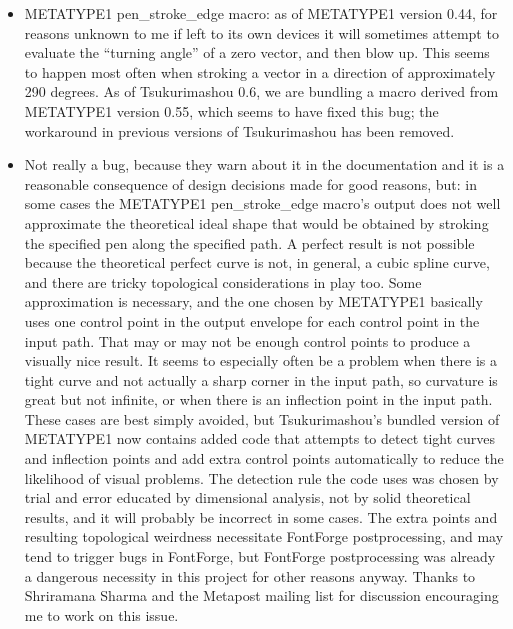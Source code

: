 \documentclass[14pt]{extarticle}
\begin{document}
\begin{itemize}
  \item METATYPE1 pen\_stroke\_edge macro: as of METATYPE1 version
    0.44, for reasons unknown to me if left to its own devices it will
    sometimes attempt to evaluate the ``turning angle'' of a zero vector,
    and then blow up.  This seems to happen most often when stroking a
    vector in a direction of approximately 290 degrees.  As of Tsukurimashou
    0.6, we are bundling a macro derived from METATYPE1 version 0.55, which
    seems to have fixed this bug; the workaround in previous versions of
    Tsukurimashou has been removed.

  \item Not really a bug, because they warn about it in the documentation
    and it is a reasonable consequence of design decisions made for good
    reasons, but: in some cases the METATYPE1 pen\_stroke\_edge macro's
    output does not well approximate the theoretical ideal shape that would
    be obtained by stroking the specified pen along the specified path.  A
    perfect result is not possible because the theoretical perfect curve is
    not, in general, a cubic spline curve, and there are tricky topological
    considerations in play too.  Some approximation is necessary, and the
    one chosen by METATYPE1 basically uses one control point in the output
    envelope for each control point in the input path.  That may or may not
    be enough control points to produce a visually nice result.  It seems to
    especially often be a problem when there is a tight curve and not
    actually a sharp corner in the input path, so curvature is great but not
    infinite, or when there is an inflection point in the input path.  These
    cases are best simply avoided, but Tsukurimashou's bundled version of
    METATYPE1 now contains added code that attempts to detect tight curves
    and inflection points and add extra control points automatically to
    reduce the likelihood of visual problems.  The detection rule the code
    uses was chosen by trial and error educated by dimensional analysis, not
    by solid theoretical results, and it will probably be incorrect in some
    cases.  The extra points and resulting topological weirdness necessitate
    FontForge postprocessing, and may tend to trigger bugs in FontForge, but
    FontForge postprocessing was already a dangerous necessity in this
    project for other reasons anyway.  Thanks to Shriramana Sharma and the
    Metapost mailing list for discussion encouraging me to work on this
    issue.


\end{itemize}
\end{document}
